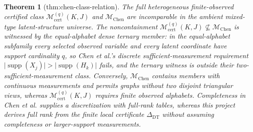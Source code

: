 \documentclass{article}
\newtheorem{theorem}{Theorem}
\begin{document}
\begin{theorem}[thm:chen-class-relation]\label{thm:chen-class-relation}
The full heterogeneous finite-observed certified class \(\mathcal M_{\mathrm{cert}}^{(q)}(K,J)\) and \(\mathcal M_{\mathrm{Chen}}\) are incomparable in the ambient mixed-type latent-structure universe.  The noncontainment \(\mathcal M_{\mathrm{cert}}^{(q)}(K,J)\not\subseteq\mathcal M_{\mathrm{Chen}}\) is witnessed by the equal-alphabet dense ternary member: in the equal-alphabet subfamily every selected observed variable and every latent coordinate have support cardinality \(q\), so Chen et al.'s discrete sufficient-measurement requirement \(\lvert\operatorname{supp}(X_j)\rvert>\lvert\operatorname{supp}(H_k)\rvert\) fails, and the ternary witness is outside their two-sufficient-measurement class.  Conversely, \(\mathcal M_{\mathrm{Chen}}\) contains members with continuous measurements and permits graphs without two disjoint triangular views, whereas \(\mathcal M_{\mathrm{cert}}^{(q)}(K,J)\) requires finite observed alphabets.  Completeness in Chen et al. supplies a discretization with full-rank tables, whereas this project derives full rank from the finite local certificate \(\Delta_{\mathrm{DT}}\) without assuming completeness or larger-support measurements.
\end{theorem}
\end{document}
